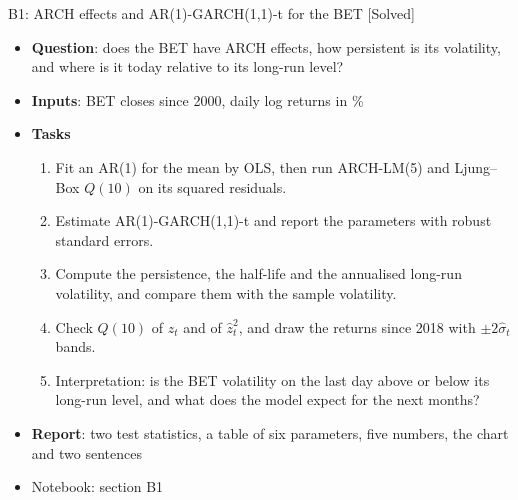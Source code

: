 \begin{frame}{B1: ARCH effects and AR(1)-GARCH(1,1)-t for the BET [Solved]}
\itemsize{\footnotesize}
\begin{itemize}
\item \textbf{Question}: does the BET have ARCH effects, how persistent is its volatility, and where is it today relative to its long-run level?
\item \textbf{Inputs}: BET closes since 2000, daily log returns in \%
\item \textbf{Tasks}
\begin{enumerate}
    \item Fit an AR(1) for the mean by OLS, then run ARCH-LM(5) and Ljung--Box $Q(10)$ on its squared residuals.
    \item Estimate AR(1)-GARCH(1,1)-t and report the parameters with robust standard errors.
    \item Compute the persistence, the half-life and the annualised long-run volatility, and compare them with the sample volatility.
    \item Check $Q(10)$ of $\hat z_t$ and of $\hat z_t^2$, and draw the returns since 2018 with $\pm 2\hat\sigma_t$ bands.
    \item Interpretation: is the BET volatility on the last day above or below its long-run level, and what does the model expect for the next months?
\end{enumerate}
\item \textbf{Report}: two test statistics, a table of six parameters, five numbers, the chart and two sentences
\item Notebook: section B1
\end{itemize}
\end{frame}

